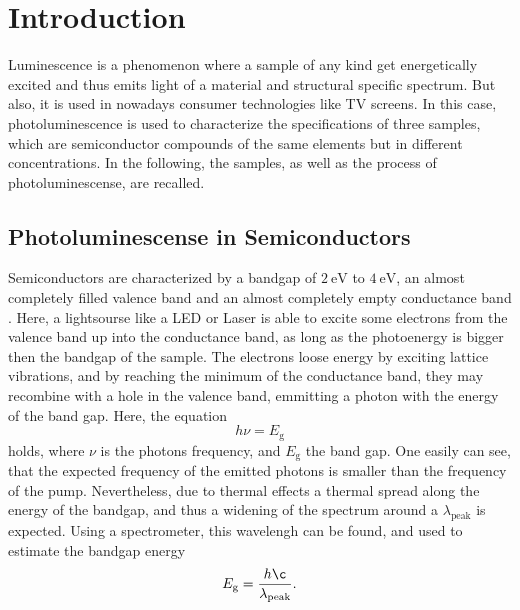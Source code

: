 \section{Introduction}
\label{sec:Introduction}

Luminescence is a phenomenon where a sample of any kind get energetically excited and thus emits light of a material and structural specific spectrum.
But also, it is used in nowadays consumer technologies like TV screens. 
In this case, photoluminescence is used to characterize the specifications of three samples, which are semiconductor compounds of the same elements but in different concentrations.
In the following, the samples, as well as the process of photoluminescense, are recalled.

\subsection{Photoluminescense in Semiconductors}
\label{sec:PLS}

Semiconductors are characterized by a bandgap of $\SI{2}{\eV}$ to $\SI{4}{\eV}$, an almost completely filled valence band and an almost completely empty conductance band \cite[391]{festkorperphysik}.
Here, a lightsourse like a LED or Laser is able to excite some electrons from the valence band up into the conductance band, as long as the photoenergy is bigger then the bandgap of the sample.
The electrons loose energy by exciting lattice vibrations, and by reaching the minimum of the conductance band, they may recombine with a hole in the valence band, emmitting a photon with the energy of the band gap.
Here, the equation
\begin{equation}
    h\nu = E_{\text{g}}
\end{equation}\label{eq:h}
holds, where $\nu$ is the photons frequency, and $E_\text{g}$ the band gap.
One easily can see, that the expected frequency of the emitted photons is smaller than the frequency of the pump. 
Nevertheless, due to thermal effects a thermal spread along the energy of the bandgap, and thus a widening of the spectrum around a $\lambda_\text{peak}$ is expected.
Using a spectrometer, this wavelengh can be found, and used to estimate the bandgap energy
\begin{equation}
    E_{\text{g}} = \frac{h\c}{\lambda_\text{peak}}.
\end{equation}\cite{Photoluminescence}

